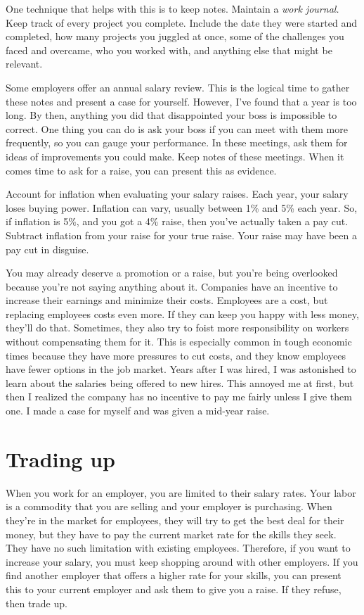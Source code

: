 One technique that helps with this is to keep notes. Maintain a \emph{work journal.} Keep track of every project you complete. Include the date they were started and completed, how many projects you juggled at once, some of the challenges you faced and overcame, who you worked with, and anything else that might be relevant.

Some employers offer an annual salary review. This is the logical time to gather these notes and present a case for yourself. However, I've found that a year is too long. By then, anything you did that disappointed your boss is impossible to correct. One thing you can do is ask your boss if you can meet with them more frequently, so you can gauge your performance. In these meetings, ask them for ideas of improvements you could make. Keep notes of these meetings. When it comes time to ask for a raise, you can present this as evidence.

Account for inflation when evaluating your salary raises. Each year, your salary loses buying power. Inflation can vary, usually between 1\% and 5\% each year. So, if inflation is 5\%, and you got a 4\% raise, then you've actually taken a pay cut. Subtract inflation from your raise for your true raise. Your raise may have been a pay cut in disguise.

You may already deserve a promotion or a raise, but you're being overlooked because you're not saying anything about it. Companies have an incentive to increase their earnings and minimize their costs. Employees are a cost, but replacing employees costs even more. If they can keep you happy with less money, they'll do that. Sometimes, they also try to foist more responsibility on workers without compensating them for it. This is especially common in tough economic times because they have more pressures to cut costs, and they know employees have fewer options in the job market. Years after I was hired, I was astonished to learn about the salaries being offered to new hires. This annoyed me at first, but then I realized the company has no incentive to pay me fairly unless I give them one. I made a case for myself and was given a mid-year raise.

\section{Trading up}
When you work for an employer, you are limited to their salary rates. Your labor is a commodity that you are selling and your employer is purchasing. When they're in the market for employees, they will try to get the best deal for their money, but they have to pay the current market rate for the skills they seek. They have no such limitation with existing employees. Therefore, if you want to increase your salary, you must keep shopping around with other employers. If you find another employer that offers a higher rate for your skills, you can present this to your current employer and ask them to give you a raise. If they refuse, then trade up.

